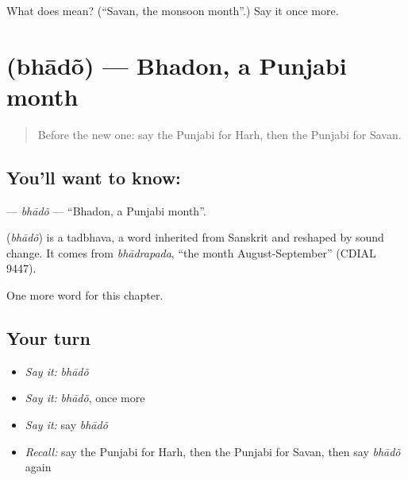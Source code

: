 \begin{tcolorbox}[breakable,colback=teal!4,colframe=teal!35!black,title={Before you move on}]
What does  mean? (\textquotedblleft{}Savan, the monsoon month\textquotedblright{}.) Say it once more.
\end{tcolorbox}
\section[\texorpdfstring{\pa{ਭਾਦੋਂ} (bhādõ)}{ਭਾਦੋਂ (bhādõ)}]{ (bhādõ) — Bhadon, a Punjabi month}

\label{lesson:PA-C104-bhado}



\begin{quote}
Before the new one: say the Punjabi for Harh, then the Punjabi for Savan.
\end{quote}

\subsection*{You'll want to know: }
\textbf{} — \emph{bhādõ} — \textquotedblleft{}Bhadon, a Punjabi month\textquotedblright{}.

\begin{cousinweb}
\textbf{} (\emph{bhādõ}) is a tadbhava, a word inherited from Sanskrit and reshaped by sound change. It comes from \emph{bhādrapada}, \textquotedblleft{}the month August-September\textquotedblright{} (CDIAL 9447).
\end{cousinweb}

\begin{grammarlens}[title={What you've built}]
One more word for this chapter.
\end{grammarlens}

\subsection*{Your turn}
\begin{itemize}
\raggedright
  \item \emph{Say it:} \emph{bhādõ}
  \item \emph{Say it:} \emph{bhādõ}, once more
  \item \emph{Say it:} say \emph{bhādõ}
  \item \emph{Recall:} say the Punjabi for Harh, then the Punjabi for Savan, then say \emph{bhādõ} again
\end{itemize}


